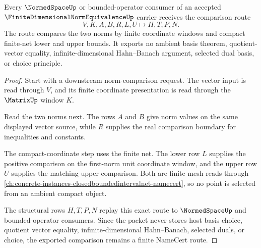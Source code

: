 \begin{theorem}
\label{thm:finite-dimensional-norm-equivalence-compact-coordinate-route}
Every $\NormedSpaceUp$ or bounded-operator consumer of an accepted $\FiniteDimensionalNormEquivalenceUp$ carrier receives the comparison route
$$
V,K,A,B,R,L,U\longmapsto H,T,P,N .
$$
The route compares the two norms by finite coordinate windows and compact finite-net lower and upper bounds. It exports no ambient basis theorem, quotient-vector equality, infinite-dimensional Hahn--Banach argument, selected dual basis, or choice principle.
\end{theorem}
\begin{proof}
Start with a downstream norm-comparison request. The vector input is read through $V$, and its finite coordinate presentation is read through the $\MatrixUp$ window $K$.

Read the two norms next. The rows $A$ and $B$ give norm values on the same displayed vector source, while $R$ supplies the real comparison boundary for inequalities and constants.

The compact-coordinate step uses the finite net. The lower row $L$ supplies the positive comparison on the first-norm unit coordinate window, and the upper row $U$ supplies the matching upper comparison. Both are finite mesh reads through \autoref{ch:concrete-instances-closedboundedintervalnet-namecert}, so no point is selected from an ambient compact object.

The structural rows $H,T,P,N$ replay this exact route to $\NormedSpaceUp$ and bounded-operator consumers. Since the packet never stores host basis choice, quotient vector equality, infinite-dimensional Hahn--Banach, selected duals, or choice, the exported comparison remains a finite NameCert route.
\end{proof}


